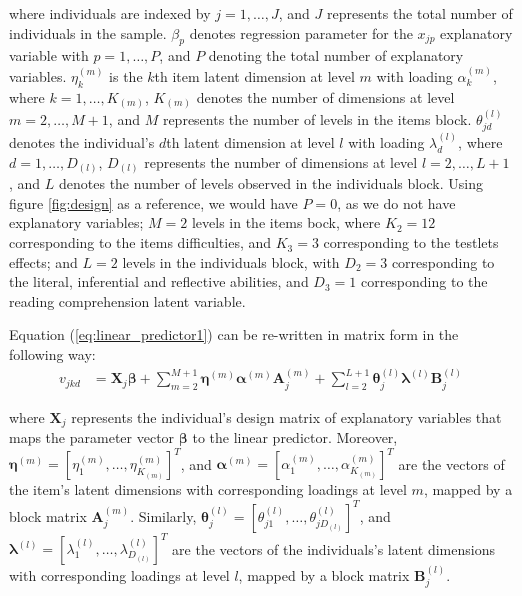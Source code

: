 \noindent where individuals are indexed by $j = 1, \dots, J$, and $J$ represents the total number of individuals in the sample. $\beta_{p}$ denotes regression parameter for the $x_{jp}$ explanatory variable with $p=1,\dots, P$, and $P$ denoting the total number of explanatory variables. $\eta_{k}^{(m)}$ is the $k$th item latent dimension at level $m$ with loading $\alpha_{k}^{(m)}$, where $k= 1, \dots, K_{(m)}$, $K_{(m)}$ denotes the number of dimensions at level $m=2,\dots, M+1$, and $M$ represents the number of levels in the items block. $\theta_{jd}^{(l)}$ denotes the individual's $d$th latent dimension at level $l$ with loading $\lambda_{d}^{(l)}$, where $d=1, \dots, D_{(l)}$, $D_{(l)}$ represents the number of dimensions at level $l=2, \dots, L+1$, and $L$ denotes the number of levels observed in the individuals block. Using figure \ref{fig:design} as a reference, we would have $P=0$, as we do not have explanatory variables; $M=2$ levels in the items bock, where $K_{2}=12$ corresponding to the items difficulties, and $K_{3}=3$ corresponding to the testlets effects; and $L=2$ levels in the individuals block, with $D_{2}=3$ corresponding to the literal, inferential and reflective abilities, and $D_{3}=1$ corresponding to the reading comprehension latent variable.

Equation (\ref{eq:linear_predictor1}) can be re-written in matrix form in the following way:
%
\begin{equation} \label{eq:linear_predictor2}
	\begin{split}
		v_{jkd} &= \mathbf{X}_{j} \pmb{\beta} + \sum_{m=2}^{M+1} \pmb{\eta}^{(m)} \pmb{\alpha}^{(m)} \mathbf{A}_{j}^{(m)} + \sum_{l=2}^{L+1} \pmb{\theta}_{j}^{(l)} \pmb{\lambda}^{(l)} \mathbf{B}_{j}^{(l)}
	\end{split}
\end{equation}

\noindent where $\mathbf{X}_{j}$ represents the individual's design matrix of explanatory variables that maps the parameter vector $\pmb{\beta}$ to the linear predictor. Moreover, $\pmb{\eta}^{(m)} = [ \eta_{1}^{(m)}, \dots, \eta_{K_{(m)}}^{(m)} ]^{T}$, and  $\pmb{\alpha}^{(m)} = [ \alpha_{1}^{(m)}, \dots, \alpha_{K_{(m)}}^{(m)} ]^{T}$ are the vectors of the item's latent dimensions with corresponding loadings at level $m$, mapped by a block matrix $\mathbf{A}_{j}^{(m)}$. Similarly, $\pmb{\theta}_{j}^{(l)} = [ \theta_{j1}^{(l)}, \dots, \theta_{jD_{(l)}}^{(l)} ]^{T}$, and  $\pmb{\lambda}^{(l)} = [ \lambda_{1}^{(l)}, \dots, \lambda_{D_{(l)}}^{(l)} ]^{T}$ are the vectors of the individuals's latent dimensions with corresponding loadings at level $l$, mapped by a block matrix $\mathbf{B}_{j}^{(l)}$.

